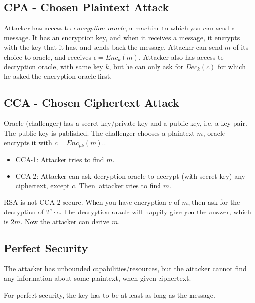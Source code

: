 \documentclass[language=english,number=]{homework}
\begin{document}
    \subsection{CPA - Chosen Plaintext Attack}

    Attacker has access to \textit{encryption oracle}, a machine to which you can send a message.
    It has an encryption key, and when it receives a message, it encrypts with the key that it has, and sends back the message.
    Attacker can send $m$ of its choice to oracle, and receives $c = Enc_k(m)$.
    Attacker also has access to decryption oracle, with same key $k$, but he can only ask for $Dec_k(c)$ for which he asked the encryption oracle first.

    \subsection{CCA - Chosen Ciphertext Attack}

    Oracle (challenger) has a secret key/private key and a public key, i.e. a key pair.
    The public key is published.
    The challenger chooses a plaintext $m$, oracle encrypts it with $c = Enc_{pk}(m)$..

    \begin{itemize}
        \item CCA-1: Attacker tries to find $m$.
        \item CCA-2: Attacker can ask decryption oracle to decrypt (with secret key) any ciphertext, except $c$.
        Then: attacker tries to find $m$.
    \end{itemize}

    RSA is not CCA-2-secure.
    When you have encryption $c$ of $m$, then ask for the decryption of $2^{e} \cdot c$.
    The decryption oracle will happily give you the answer, which is $2m$.
    Now the attacker can derive $m$.

    \subsection{Perfect Security}

    The attacker has unbounded capabilities/resources, but the attacker cannot find any information about some plaintext, when given ciphertext.

    \begin{theorem}[Shannon]
        For perfect security, the key has to be at least as long as the message.
    \end{theorem}
\end{document}
